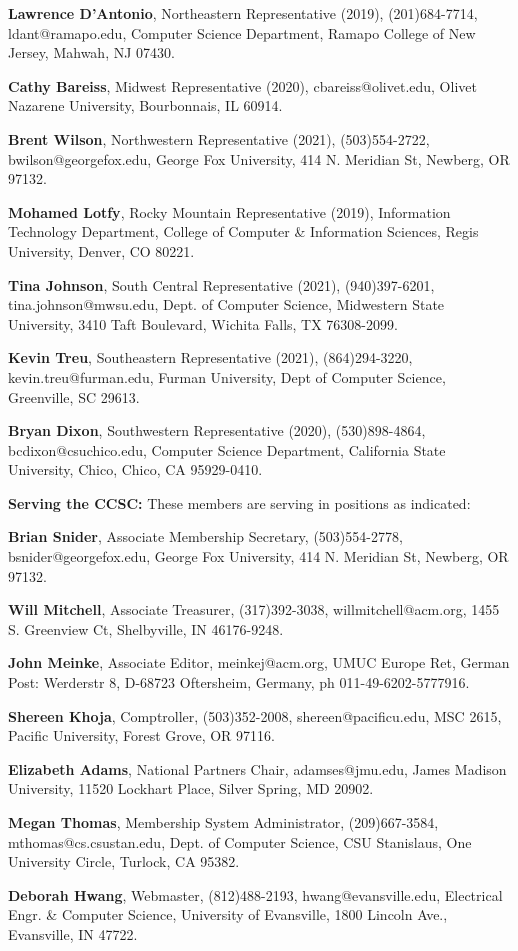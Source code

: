 \documentclass{article}
\begin{document}
\begin{footnotesize}
\begin{multicols}{2}
\begin{raggedright}
\noindent
\textbf{Lawrence D'Antonio}, Northeastern Representative (2019), (201)684-7714,
ldant@ramapo.edu, Computer Science Department, Ramapo College of New Jersey,
Mahwah, NJ 07430.

\noindent
\textbf{Cathy Bareiss}, Midwest Representative (2020), cbareiss@olivet.edu,
Olivet Nazarene University, Bourbonnais, IL 60914.

\noindent
\textbf{Brent Wilson}, Northwestern Representative (2021), (503)554-2722,
bwilson@georgefox.edu, George Fox University, 414 N. Meridian St, Newberg,
OR 97132.

\noindent
\textbf{Mohamed Lotfy}, Rocky Mountain Representative (2019), Information
Technology Department, College of Computer \& Information Sciences, Regis
University, Denver, CO 80221.

\noindent
\textbf{Tina Johnson}, South Central Representative (2021), (940)397-6201,
tina.johnson@mwsu.edu, Dept. of Computer Science, Midwestern State University,
3410 Taft Boulevard, Wichita Falls, TX 76308-2099.

\noindent
\textbf{Kevin Treu}, Southeastern Representative (2021), (864)294-3220,
kevin.treu@furman.edu, Furman University, Dept of Computer Science, Greenville,
SC 29613.

\noindent
\textbf{Bryan Dixon}, Southwestern Representative (2020), (530)898-4864,
bcdixon@csuchico.edu, Computer Science Department, California State University,
Chico, Chico, CA 95929-0410.

\noindent
\textbf{Serving the CCSC:} These members are serving in positions as indicated:

\noindent
\textbf{Brian Snider}, Associate Membership Secretary, (503)554-2778,
bsnider@georgefox.edu, George Fox University, 414 N. Meridian St, Newberg,
OR 97132.

\noindent
\textbf{Will Mitchell}, Associate Treasurer, (317)392-3038,
willmitchell@acm.org, 1455 S. Greenview Ct, Shelbyville, IN 46176-9248.

\noindent
\textbf{John Meinke}, Associate Editor, meinkej@acm.org, UMUC Europe Ret,
German Post: Werderstr 8, D-68723 Oftersheim, Germany, ph 011-49-6202-5777916.

\noindent
\textbf{Shereen Khoja}, Comptroller, (503)352-2008, shereen@pacificu.edu,
MSC 2615, Pacific University, Forest Grove, OR 97116.

\noindent
\textbf{Elizabeth Adams}, National Partners Chair, adamses@jmu.edu,
James Madison University, 11520 Lockhart Place, Silver Spring, MD 20902.

\noindent
\textbf{Megan Thomas}, Membership System Administrator, (209)667-3584,
mthomas@cs.csustan.edu, Dept. of Computer Science, CSU Stanislaus,
One University Circle, Turlock, CA 95382.

\noindent
\textbf{Deborah Hwang}, Webmaster, (812)488-2193, hwang@evansville.edu,
Electrical Engr. \& Computer Science, University of Evansville,
1800 Lincoln Ave., Evansville, IN 47722.

\end{raggedright}
\end{multicols}
\end{footnotesize}
\end{document}
